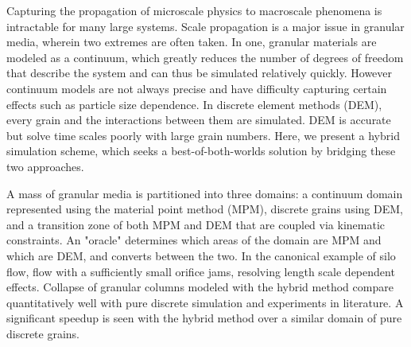% 
% 
%
Capturing the propagation of microscale physics to macroscale phenomena is intractable for many large systems. Scale propagation is a major issue in granular media, wherein two extremes are often taken. In one, granular materials are modeled as a continuum, which greatly reduces the number of degrees of freedom that describe the system and can thus be simulated relatively quickly. However continuum models are not always precise and have difficulty capturing certain effects such as particle size dependence. In discrete element methods (DEM), every grain and the interactions between them are simulated. DEM is accurate but solve time scales poorly with large grain numbers. Here, we present a hybrid simulation scheme, which seeks a best-of-both-worlds solution by bridging these two approaches.

A mass of granular media is partitioned into three domains: a continuum domain represented using the material point method (MPM), discrete grains using DEM, and a transition zone of both MPM and DEM that are coupled via kinematic constraints. An "oracle" determines which areas of the domain are MPM and which are DEM, and converts between the two. In the canonical example of silo flow, flow with a sufficiently small orifice jams, resolving length scale dependent effects. Collapse of granular columns modeled with the hybrid method compare quantitatively well with pure discrete simulation and experiments in literature. A significant speedup is seen with the hybrid method over a similar domain of pure discrete grains.
